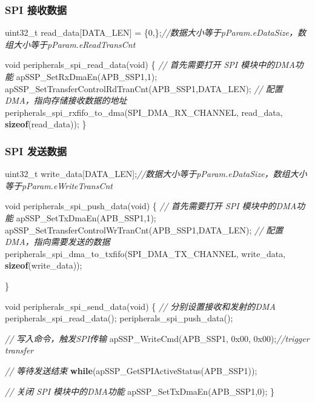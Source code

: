 \documentclass[
  12pt,
]{book}
\newenvironment{Shaded}{\begin{snugshade}}{\end{snugshade}}
\newcommand{\BaseNTok}[1]{\textcolor[rgb]{0.00,0.00,0.81}{#1}}
\newcommand{\CommentTok}[1]{\textcolor[rgb]{0.56,0.35,0.01}{\textit{#1}}}
\newcommand{\ControlFlowTok}[1]{\textcolor[rgb]{0.13,0.29,0.53}{\textbf{#1}}}
\newcommand{\DataTypeTok}[1]{\textcolor[rgb]{0.13,0.29,0.53}{#1}}
\newcommand{\DecValTok}[1]{\textcolor[rgb]{0.00,0.00,0.81}{#1}}
\newcommand{\KeywordTok}[1]{\textcolor[rgb]{0.13,0.29,0.53}{\textbf{#1}}}
\newcommand{\NormalTok}[1]{#1}
\begin{document}
\hypertarget{spi-ux63a5ux6536ux6570ux636e-3}{%
\subsubsection{SPI 接收数据}\label{spi-ux63a5ux6536ux6570ux636e-3}}

\begin{Shaded}
\begin{Highlighting}[]
\DataTypeTok{uint32_t}\NormalTok{ read_data[DATA_LEN] = \{}\DecValTok{0}\NormalTok{,\};}\CommentTok{//数据大小等于pParam.eDataSize，数组大小等于pParam.eReadTransCnt}

\DataTypeTok{void}\NormalTok{ peripherals_spi_read_data(}\DataTypeTok{void}\NormalTok{)}
\NormalTok{\{}
  \CommentTok{// 首先需要打开 SPI 模块中的DMA功能}
\NormalTok{  apSSP_SetRxDmaEn(APB_SSP1,}\DecValTok{1}\NormalTok{);}
\NormalTok{  apSSP_SetTransferControlRdTranCnt(APB_SSP1,DATA_LEN);}
  \CommentTok{// 配置DMA，指向存储接收数据的地址}
\NormalTok{  peripherals_spi_rxfifo_to_dma(SPI_DMA_RX_CHANNEL, read_data, }\KeywordTok{sizeof}\NormalTok{(read_data));}
\NormalTok{\}}
\end{Highlighting}
\end{Shaded}

\hypertarget{spi-ux53d1ux9001ux6570ux636e-3}{%
\subsubsection{SPI 发送数据}\label{spi-ux53d1ux9001ux6570ux636e-3}}

\begin{Shaded}
\begin{Highlighting}[]
\DataTypeTok{uint32_t}\NormalTok{ write_data[DATA_LEN];}\CommentTok{//数据大小等于pParam.eDataSize，数组大小等于pParam.eWriteTransCnt}

\DataTypeTok{void}\NormalTok{ peripherals_spi_push_data(}\DataTypeTok{void}\NormalTok{)}
\NormalTok{\{}
  \CommentTok{// 首先需要打开 SPI 模块中的DMA功能}
\NormalTok{  apSSP_SetTxDmaEn(APB_SSP1,}\DecValTok{1}\NormalTok{);}
\NormalTok{  apSSP_SetTransferControlWrTranCnt(APB_SSP1,DATA_LEN);}
  \CommentTok{// 配置DMA，指向需要发送的数据}
\NormalTok{  peripherals_spi_dma_to_txfifo(SPI_DMA_TX_CHANNEL, write_data, }\KeywordTok{sizeof}\NormalTok{(write_data));}

\NormalTok{\}}

\DataTypeTok{void}\NormalTok{ peripherals_spi_send_data(}\DataTypeTok{void}\NormalTok{)}
\NormalTok{\{}
  \CommentTok{// 分别设置接收和发射的DMA}
\NormalTok{  peripherals_spi_read_data();}
\NormalTok{  peripherals_spi_push_data();}
  
  \CommentTok{// 写入命令，触发SPI传输}
\NormalTok{  apSSP_WriteCmd(APB_SSP1, }\BaseNTok{0x00}\NormalTok{, }\BaseNTok{0x00}\NormalTok{);}\CommentTok{//trigger transfer}

  \CommentTok{// 等待发送结束}
  \ControlFlowTok{while}\NormalTok{(apSSP_GetSPIActiveStatus(APB_SSP1));}
  
  \CommentTok{// 关闭 SPI 模块中的DMA功能}
\NormalTok{  apSSP_SetTxDmaEn(APB_SSP1,}\DecValTok{0}\NormalTok{);}
\NormalTok{\}}
\end{Highlighting}
\end{Shaded}
\end{document}

